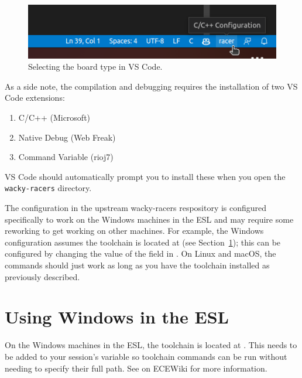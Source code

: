 \begin{figure}
\centering
\includegraphics{figs/vscode-config.png}
\caption{Selecting the board type in VS Code.}
\label{fig:vscode-config}
\end{figure}

As a side note, the compilation and debugging requires the
installation of two VS Code extensions:
%
\begin{enumerate}
\item C/C++ (Microsoft)
\item Native Debug (Web Freak)
\item Command Variable (rioj7)
\end{enumerate}
%
VS Code should automatically prompt you to install these when you open
the \verb|wacky-racers| directory.

The  configuration in the upstream wacky-racers
respository is configured specifically to work on the Windows machines
in the ESL and may require some reworking to get working on other
machines. For example, the Windows configuration assumes the toolchain
is located at  (see
Section~\ref{esl-windows}); this can be configured by changing the
value of the  field in
. On Linux and macOS, the commands should
just work as long as you have the toolchain installed as previously
described.

\section{Using Windows in the ESL} \label{esl-windows}

On the Windows machines in the ESL, the toolchain is located at
. This needs to be added to your session's
 variable so toolchain commands can be run without needing to
specify their full path. See
 on ECEWiki for more
information.

